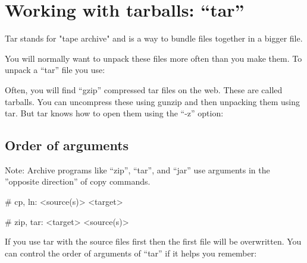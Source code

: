 \section{Working with tarballs: ``tar''}

Tar stands for "tape archive" and is a way to bundle files together in a bigger
file.

You will normally want to unpack these files more often than you make them. To
unpack a ``tar'' file you use:

\begin{prompt}
\end{prompt}

Often, you will find ``gzip'' compressed tar files on the web. These are called
tarballs. You can uncompress these using gunzip and then unpacking them using
tar. But tar knows how to open them using the ``-z'' option:

\begin{prompt}
\end{prompt}

\subsection{Order of arguments}

Note: Archive programs like ``zip'', ``tar'', and ``jar'' use arguments in the
''opposite direction'' of copy commands.

\begin{prompt}
    # cp, ln: <source(s)> <target>

    # zip, tar: <target> <source(s)>
\end{prompt}

If you use tar with the source files first then the first file will be
overwritten. You can control the order of arguments of ``tar'' if it helps you
remember:

\begin{prompt}
\end{prompt}
